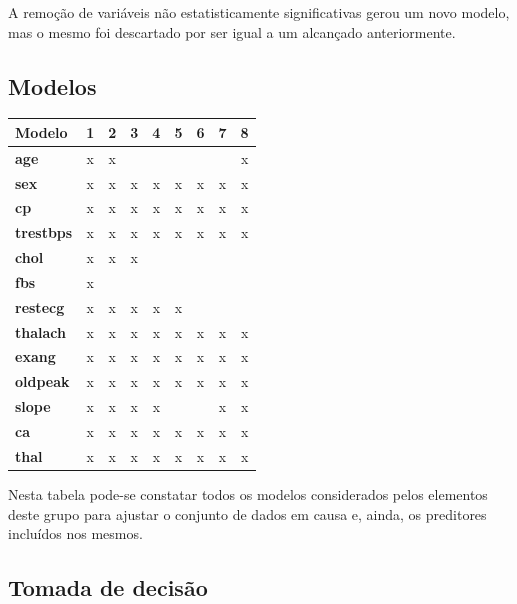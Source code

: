 \documentclass[a4paper]{report}
\begin{document}
{	A remoção de variáveis não estatisticamente significativas gerou um novo modelo, mas o mesmo foi descartado por ser igual a um alcançado anteriormente.


	\subsection{Modelos}

	\begin{center}
		\begin{tabular}{ || l || c | c | c | c | c | c | c | c || }
		\hline
		\textbf{Modelo} & \textbf{1} & \textbf{2} & \textbf{3} & \textbf{4} & \textbf{5} & \textbf{6} & \textbf{7} & \textbf{8} \\
		\hline
		\hline
		\textbf{age} 		& x & x &   &	&	&	&	& x	\\
		\hline
		\textbf{sex} 		& x & x & x & x	& x	& x	& x	& x	\\
		\hline
		\textbf{cp} 		& x & x & x	& x	& x	& x	& x	& x	\\
		\hline
		\textbf{trestbps} 	& x & x & x & x	& x	& x	& x	& x	\\
		\hline
		\textbf{chol} 		& x & x & x &	&	&	&	& 	\\
		\hline
		\textbf{fbs} 		& x &   &   &	&	&	&	& 	\\
		\hline
		\textbf{restecg} 	& x & x & x & x	& x	&	& 	&	\\
		\hline
		\textbf{thalach} 	& x & x & x & x	& x	& x	& x	& x	\\
		\hline
		\textbf{exang} 		& x & x & x & x & x	& x	& x	& x	\\
		\hline
		\textbf{oldpeak} 	& x & x & x & x & x	& x	& x	& x	\\
		\hline
		\textbf{slope} 		& x & x & x & x	&	&	& x	& x	\\
		\hline
		\textbf{ca} 		& x & x & x & x	& x	& x & x	& x	\\
		\hline
		\textbf{thal} 		& x & x & x & x	& x	& x	& x	& x	\\
		\hline
		\end{tabular}
	\end{center}

	Nesta tabela pode-se constatar todos os modelos considerados pelos elementos deste grupo para ajustar o conjunto de dados em causa e, ainda, os preditores incluídos nos mesmos.


	\subsection{Tomada de decisão}

}
\end{document}
